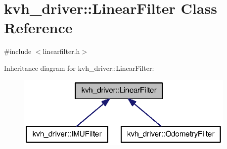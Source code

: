 \section{kvh\-\_\-driver\-:\-:\-Linear\-Filter \-Class \-Reference}
\label{classkvh__driver_1_1LinearFilter}


{\ttfamily \#include $<$linearfilter.\-h$>$}



\-Inheritance diagram for kvh\-\_\-driver\-:\-:\-Linear\-Filter\-:
\nopagebreak
\begin{figure}[H]
\begin{center}
\leavevmode
\includegraphics[width=302pt]{classkvh__driver_1_1LinearFilter__inherit__graph}
\end{center}
\end{figure}
